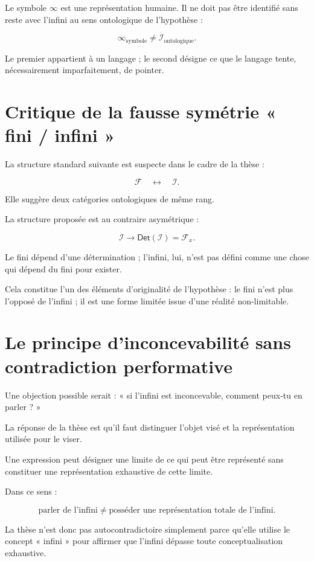 \documentclass[11pt,a4paper]{article}
\newcommand{\Inf}{\mathcal I}
\newcommand{\Fin}{\mathcal F}
\newcommand{\Det}{\mathsf{Det}}
\begin{document}
Le symbole \(\infty\) est une représentation humaine. Il ne doit pas être identifié sans reste avec l'infini au sens ontologique de l'hypothèse :

\[
\boxed{\infty_{\mathrm{symbole}} \neq \Inf_{\mathrm{ontologique}}.}
\]

Le premier appartient à un langage ; le second désigne ce que le langage tente, nécessairement imparfaitement, de pointer.

\section{Critique de la fausse symétrie « fini / infini »}

La structure standard suivante est suspecte dans le cadre de la thèse :

\[
\Fin \quad \leftrightarrow \quad \Inf.
\]

Elle suggère deux catégories ontologiques de même rang.

La structure proposée est au contraire asymétrique :

\[
\boxed{
\Inf \longrightarrow \Det(\Inf) = \Fin_x.
}
\]

Le fini dépend d'une détermination ; l'infini, lui, n'est pas défini comme une chose qui dépend du fini pour exister.

Cela constitue l'un des éléments d'originalité de l'hypothèse : le fini n'est plus l'opposé de l'infini ; il est une forme limitée issue d'une réalité non-limitable.

\section{Le principe d'inconcevabilité sans contradiction performative}

Une objection possible serait : « si l'infini est inconcevable, comment peux-tu en parler ? »

La réponse de la thèse est qu'il faut distinguer l'objet visé et la représentation utilisée pour le viser.

Une expression peut désigner une limite de ce qui peut être représenté sans constituer une représentation exhaustive de cette limite.

Dans ce sens :

\[
\boxed{
\text{parler de l'infini} \neq \text{posséder une représentation totale de l'infini}.
}
\]

La thèse n'est donc pas autocontradictoire simplement parce qu'elle utilise le concept « infini » pour affirmer que l'infini dépasse toute conceptualisation exhaustive.
\end{document}
